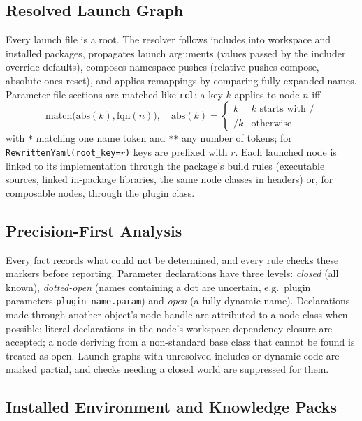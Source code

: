 \documentclass[conference]{IEEEtran}
\newcommand{\code}[1]{\texttt{#1}}
\begin{document}
\subsection{Resolved Launch Graph}
\label{sec:graph}

Every launch file is a root. The resolver follows includes into workspace and installed
packages, propagates launch arguments (values passed by the includer override defaults),
composes namespace pushes (relative pushes compose, absolute ones reset), and applies remappings
by comparing fully expanded names. Parameter-file sections are matched like \code{rcl}: a key
$k$ applies to node $n$ iff
\begin{equation}
\mathrm{match}\big(\mathrm{abs}(k), \mathrm{fqn}(n)\big),\quad
\mathrm{abs}(k) = \begin{cases} k & k \text{ starts with } / \\ /k & \text{otherwise}\end{cases}
\end{equation}
with \code{*} matching one name token and \code{**} any number of tokens; for
\code{RewrittenYaml(root\_key=$r$)} keys are prefixed with $r$. Each launched node is linked to
its implementation through the package's build rules (executable sources, linked in-package
libraries, the same node classes in headers) or, for composable nodes, through the plugin class.

\subsection{Precision-First Analysis}
\label{sec:precision}

Every fact records what could not be determined, and every rule checks these markers before
reporting. Parameter declarations have three levels: \emph{closed} (all known),
\emph{dotted-open} (names containing a dot are uncertain, e.g.\ plugin parameters
\code{plugin\_name.param}) and \emph{open} (a fully dynamic name). Declarations made through
another object's node handle are attributed to a node class when possible; literal declarations
in the node's workspace dependency closure are accepted; a node deriving from a non-standard base
class that cannot be found is treated as open. Launch graphs with unresolved includes or dynamic
code are marked partial, and checks needing a closed world are suppressed for them.

\subsection{Installed Environment and Knowledge Packs}
\label{sec:installed}
\end{document}
